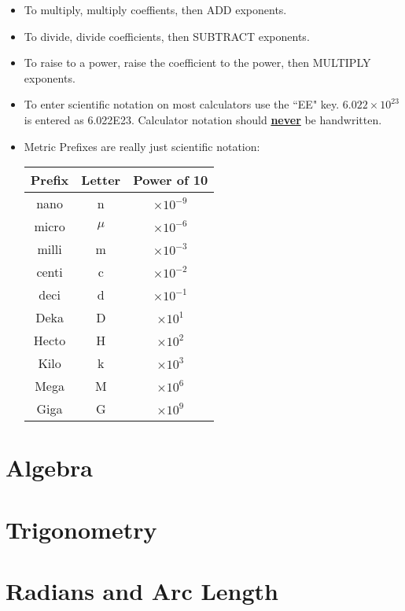 \begin{itemize}
		\item To multiply, multiply coeffients, then ADD exponents.
		\item To divide, divide coefficients, then SUBTRACT exponents.
		\item To raise to a power, raise the coefficient to the power, then MULTIPLY exponents.
		\item To enter scientific notation on most calculators use the ``EE" key. $6.022 \times 10^{23}$ is entered as 6.022\scriptsize E\normalsize23.  Calculator notation should \underline{\textbf{never}} be handwritten. 
		\item Metric Prefixes are really just scientific notation:
		\begin{center}
			\begin{tabular}{|c|c|c|}
				\hline
				Prefix & Letter & Power of 10 \\
				\hline
				nano & n &  $ \times 10^{-9}$ \\
				\hline
				micro & $\mu$ &  $ \times 10^{-6}$ \\
				\hline
				milli & m & $ \times 10^{-3}$ \\
				\hline
				centi & c & $ \times 10^{-2}$ \\
				\hline
				deci & d & $ \times 10^{-1}$ \\
				\hline
				Deka & D & $ \times 10^{1}$ \\
				\hline
				Hecto & H & $ \times 10^{2}$ \\
				\hline
				Kilo & k & $ \times 10^{3}$ \\
				\hline
				Mega & M & $ \times 10^{6}$ \\
				\hline
				Giga & G & $ \times 10^{9}$ \\
				\hline
				
			\end{tabular}	
		\end{center}
		
		
	\end{itemize}
\newpage

\section{Algebra}
\newpage
\section{Trigonometry}

\newpage
\section {Radians and Arc Length}
